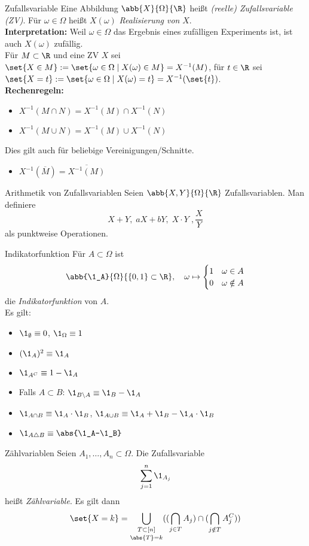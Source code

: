 \begin{karte}{Zufallsvariable}
	Eine Abbildung $\abb{X}{\Omega}{\R}$ heißt \textit{(reelle) Zufallsvariable (ZV)}. Für $\omega \in \Omega$ heißt $X(\omega)$ \textit{Realisierung von} $X$. \\
	\textbf{Interpretation:} Weil $\omega \in\Omega$ das Ergebnis eines zufälligen Experiments ist, ist auch $X(\omega)$ \glqq zufällig\grqq. \\
	Für $M \subset \R$ und eine ZV $X$ sei $\set{X \in M} := \set{\omega  \in \Omega \;|\; X(\omega) \in M} = X^{-1}(M)$, für $t \in \R$ sei $\set{X = t} := \set{\omega \in \Omega \;|\; X(\omega) = t} = X^{-1}(\set{t})$. \\
	\textbf{Rechenregeln:}
	\begin{itemize}
		\item $X^{-1}(M \cap N) = X^{-1}(M) \cap X^{-1}(N)$
		\item $X^{-1}(M \cup N) = X^{-1}(M) \cup X^{-1}(N)$
	\end{itemize}
	Dies gilt auch für beliebige Vereinigungen/Schnitte.
	\begin{itemize}
		\item $X^{-1}(\overline{M}) = \overline{X^{-1}(M)}$
	\end{itemize}
\end{karte}

\begin{karte}{Arithmetik von Zufallsvariablen}
	Seien $\abb{X,Y}{\Omega}{\R}$ Zufallsvariablen. Man definiere 
	$$X+Y,\; aX+bY,\; X\cdot Y\; ,\frac{X}{Y}$$ als punktweise Operationen.
\end{karte}

\begin{karte}{Indikatorfunktion}
	Für $A \subset \Omega$ ist
	$$\abb{\1_A}{\Omega}{\{0,1\} \subset\R}, \quad \omega \mapsto
	\begin{cases}
	1 & \omega \in A \\
	0 & \omega \notin A
	\end{cases}$$
	die \textit{Indikatorfunktion} von $A$. \\
	Es gilt:
	\begin{itemize}
		\item $\1_{\emptyset} \equiv 0$, \quad $\1_{\Omega} \equiv 1$
		\item $(\1_A)^2 \equiv \1_A$
		\item $\1_{A^C} \equiv 1-\1_A$
		\item Falls $A\subset B$: $\1_{B \setminus A} \equiv \1_B - \1_A$
		\item $\1_{A \cap B} \equiv \1_A \cdot \1_B$, \quad $\1_{A \cup B} \equiv \1_A + \1_B - \1_A \cdot \1_B$
		\item $\1_{A \triangle B} \equiv \abs{\1_A-\1_B}$
	\end{itemize}
\end{karte} 

\begin{karte}{Zählvariablen}
	Seien $A_1,\dotsc,A_n \subset \Omega$. Die Zufallsvariable $$ \sum_{j=1}^{n} \1_{A_j}$$ heißt \textit{Zählvariable}. Es gilt dann
	$$ \set{X=k}=\mathop{\bigcup_{T \subset [n]}}_{\abs{T}=k}((\bigcap_{j \in T} A_j) \cap (\bigcap_{j \notin T} A_j^C))$$
\end{karte}